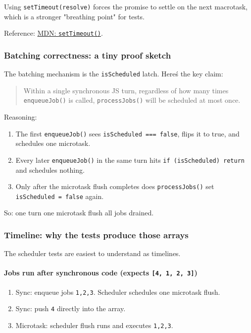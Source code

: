 Using \texttt{setTimeout(resolve)} forces the promise to settle on the next macrotask,
which is a stronger "breathing point" for tests.

Reference: \href{https://developer.mozilla.org/en-US/docs/Web/API/setTimeout}{MDN: \texttt{setTimeout()}}.

\subsubsection{Batching correctness: a tiny proof sketch}

The batching mechanism is the \texttt{isScheduled} latch.
Here\'s the key claim:

\begin{quote}
Within a single synchronous JS turn, regardless of how many times \texttt{enqueueJob()} is called,
      \texttt{processJobs()} will be scheduled at most once.
\end{quote}

Reasoning:

\begin{enumerate}
  \item The first \texttt{enqueueJob()} sees \texttt{isScheduled === false}, flips it to true, and schedules one microtask.
  \item Every later \texttt{enqueueJob()} in the same turn hits \texttt{if (isScheduled) return} and schedules nothing.
  \item Only after the microtask flush completes does \texttt{processJobs()} set \texttt{isScheduled = false} again.
\end{enumerate}

So: one turn \textrightarrow one microtask flush \textrightarrow all jobs drained.

\subsubsection{Timeline: why the tests produce those arrays}

The scheduler tests are easiest to understand as timelines.

\paragraph{Jobs run after synchronous code (expects \texttt{[4, 1, 2, 3]})}

\begin{enumerate}
  \item Sync: enqueue jobs \texttt{1,2,3}. Scheduler schedules one microtask flush.
  \item Sync: push \texttt{4} directly into the array.
  \item Microtask: scheduler flush runs and executes \texttt{1,2,3}.
\end{enumerate}

